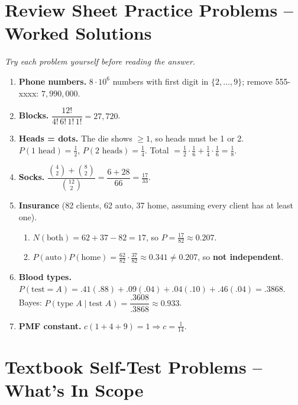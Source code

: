 \documentclass[11pt]{article}
\newcommand{\nCr}[2]{\binom{#1}{#2}}
\begin{document}
\section{Review Sheet Practice Problems -- Worked Solutions}\label{sec:practice}
\textit{Try each problem yourself before reading the answer.}

\begin{enumerate}[label=\textbf{\arabic*.},start=2]
\item \textbf{Phone numbers.} $8\cdot10^6$ numbers with first digit in $\{2,\dots,9\}$; remove 555-xxxx: $\boxed{7{,}990{,}000}$.
\item \textbf{Blocks.} $\dfrac{12!}{4!\,6!\,1!\,1!}=\boxed{27{,}720}$.
\item \textbf{Heads = dots.} The die shows $\ge1$, so heads must be 1 or 2. $P(1\text{ head})=\frac12$, $P(2\text{ heads})=\frac14$. Total $=\frac12\cdot\frac16+\frac14\cdot\frac16=\boxed{\tfrac18}$.
\item \textbf{Socks.} $\dfrac{\nCr42+\nCr82}{\nCr{12}2}=\dfrac{6+28}{66}=\boxed{\tfrac{17}{33}}$.
\item \textbf{Insurance} (82 clients, 62 auto, 37 home, assuming every client has at least one).
 \begin{enumerate}[label=(\alph*)]
 \item $N(\text{both})=62+37-82=17$, so $P=\boxed{\tfrac{17}{82}\approx0.207}$.
 \item $P(\text{auto})P(\text{home})=\frac{62}{82}\cdot\frac{37}{82}\approx0.341\ne0.207$, so \textbf{not independent}.
 \end{enumerate}
\item \textbf{Blood types.} $P(\text{test}=A)=.41(.88)+.09(.04)+.04(.10)+.46(.04)=.3868$. Bayes:
 $P(\text{type }A\mid\text{test }A)=\dfrac{.3608}{.3868}\approx\boxed{0.933}$.
\item \textbf{PMF constant.} $c(1+4+9)=1\Rightarrow c=\boxed{\tfrac1{14}}$.
\end{enumerate}

\section{Textbook Self-Test Problems -- What's In Scope}\label{sec:selftest}
\end{document}
